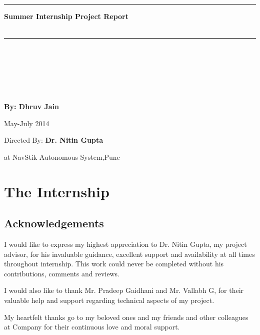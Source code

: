 \documentclass[12pt]{article}
\begin{document}
~\\ ~\\ ~\\ ~\\ ~\\ ~\\ ~\\ ~\\ ~\\ ~\\
\rule[0.5ex]{\linewidth}{1pt}
\begin{center}
\fontsize{30}{36}
\textbf{Summer Internship Project Report}
\\ ~\\
\end{center}
\rule[0.5ex]{\linewidth}{1pt}
\\ ~\\ ~\\ ~\\ ~\\
\begin{center}
\fontsize{30}{36}
\textbf{By: Dhruv Jain}
\end{center}
\begin{center}
\fontsize{18}{22}\selectfont
 May-July 2014
\end{center}
\begin{center}
\fontsize{30}{36}\selectfont
Directed By: \textbf{Dr. Nitin Gupta}
\end{center}
\begin{center}
\fontsize{30}{36}\selectfont
at NavStik Autonomous System,Pune
\end{center}
\newpage
{}
\tableofcontents
\clearpage
\section{The Internship}
\subsection{Acknowledgements}
\par I would like to express my highest appreciation to Dr. Nitin Gupta, my
project advisor, for his invaluable guidance, excellent support and availability at all times throughout internship. This work could never be completed without his
contributions, comments and reviews.\newline \par
I would also like to thank Mr. Pradeep Gaidhani and Mr. Vallabh G, for their valuable help and support regarding technical aspects of my project.\newline \par
My heartfelt thanks go to my beloved ones and my friends and other colleagues at Company for their continuous love and moral support.
\end{document}

